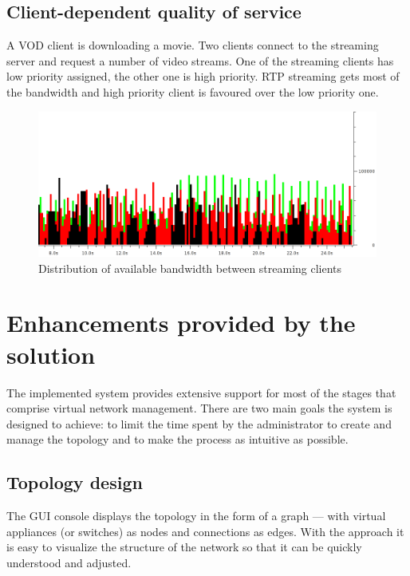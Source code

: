 \documentclass[11pt]{book}
\begin{document}
      \subsection{Client-dependent quality of service}
      \label{sub:uc:client}

        A VOD client is downloading a movie. Two clients connect to the streaming server and request a number of video
        streams. One of the streaming clients has low priority assigned, the other one is high priority. RTP streaming
        gets most of the bandwidth and high priority client is favoured over the low priority one.

        \begin{figure}[H]
          \begin{center}
            \includegraphics[width=.7\textwidth]{img/test-case/exp-all.png}
          \end{center}

          \caption{Distribution of available bandwidth between streaming clients}
        \end{figure}


    \section{Enhancements provided by the solution}
    \label{sec:uc:enhance}

      The implemented system provides extensive support for most of the stages that comprise virtual network management.
      There are two main goals the system is designed to achieve: to limit the time spent by the administrator to create
      and manage the topology and to make the process as intuitive as possible.


      \subsection{Topology design}
      \label{sub:uc:enhance:design}

        The GUI console displays the topology in the form of a graph --- with virtual appliances (or switches) as nodes
        and connections as edges. With the approach it is easy to visualize the structure of the network so that it can
        be quickly understood and adjusted.
\end{document}
